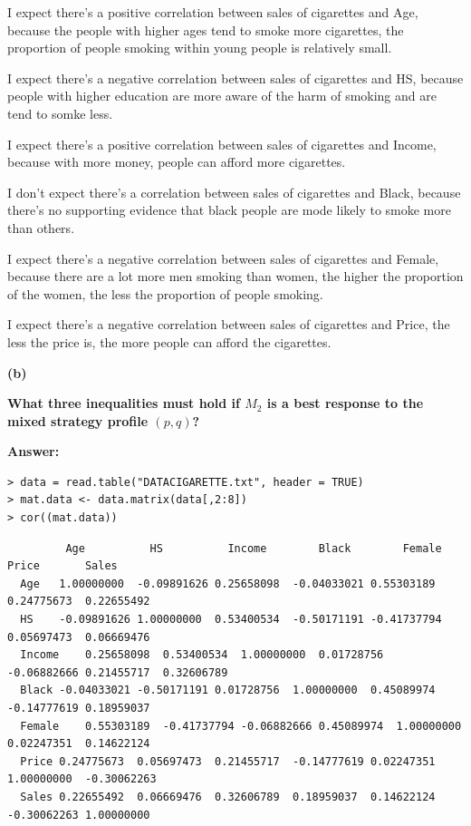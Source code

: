 \documentclass[letterpaper,11pt]{article}
\begin{document}
I expect there's a positive correlation between sales of cigarettes and Age, because the people with higher ages tend to smoke more cigarettes, the proportion of people smoking within young people is relatively small.\par
I expect there's a negative correlation between sales of cigarettes and HS, because people with higher education are more aware of the harm of smoking and are tend to somke less.\par
I expect there's a positive correlation between sales of cigarettes and Income, because with more money, people can afford more cigarettes.\par
I don't expect there's a correlation between sales of cigarettes and Black, because there's no supporting evidence that black people are mode likely to smoke more than others.\par
I expect there's a negative correlation between sales of cigarettes and Female, because there are a lot more men smoking than women, the higher the proportion of the women, the less the proportion of people smoking.\par
I expect there's a negative correlation between sales of cigarettes and Price, the less the price is, the more people can afford the cigarettes.\par


\begin{addmargin}[-1.1em]{0em}
\textbf{(b)}\par\end{addmargin}
  \textbf{What three inequalities must hold if $M_2$ is a best response to the mixed strategy profile $(p,q)$?}\par
\bigbreak
\begin{addmargin}[-0.5em]{0em}
\textbf{Answer: }\end{addmargin}



\begin{lstlisting}
> data = read.table("DATACIGARETTE.txt", header = TRUE)
> mat.data <- data.matrix(data[,2:8])
> cor((mat.data))
\end{lstlisting}

\begin{lstlisting}
         Age	      HS	      Income	    Black	     Female	    Price	    Sales
  Age	1.00000000	-0.09891626	0.25658098	-0.04033021	0.55303189	0.24775673	0.22655492
  HS	-0.09891626	1.00000000	0.53400534	-0.50171191	-0.41737794	0.05697473	0.06669476
  Income	0.25658098	0.53400534	1.00000000	0.01728756	-0.06882666	0.21455717	0.32606789
  Black	-0.04033021	-0.50171191	0.01728756	1.00000000	0.45089974	-0.14777619	0.18959037
  Female	0.55303189	-0.41737794	-0.06882666	0.45089974	1.00000000	0.02247351	0.14622124
  Price	0.24775673	0.05697473	0.21455717	-0.14777619	0.02247351	1.00000000	-0.30062263
  Sales	0.22655492	0.06669476	0.32606789	0.18959037	0.14622124	-0.30062263	1.00000000
\end{lstlisting}
\end{document}
